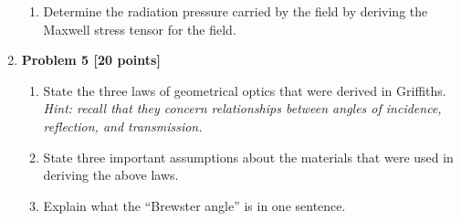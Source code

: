 \documentclass[fleqn]{article}
\begin{document}
\begin{enumerate}
\begin{enumerate}

        \item Determine the radiation pressure carried by the field by deriving the Maxwell stress tensor for
        the field.

        
      \end{enumerate}

    \item \textbf{Problem 5 [20 points]}
    \begin{enumerate}
      \item State the three laws of geometrical optics that were derived in Griffiths. \emph{Hint: recall that they
      concern relationships between angles of incidence, reflection, and transmission.}



      \item State three important assumptions about the materials that were used in deriving the above laws.



      \item Explain what the “Brewster angle” is in one sentence.

      
    \end{enumerate}

  \end{enumerate}
\end{document}
